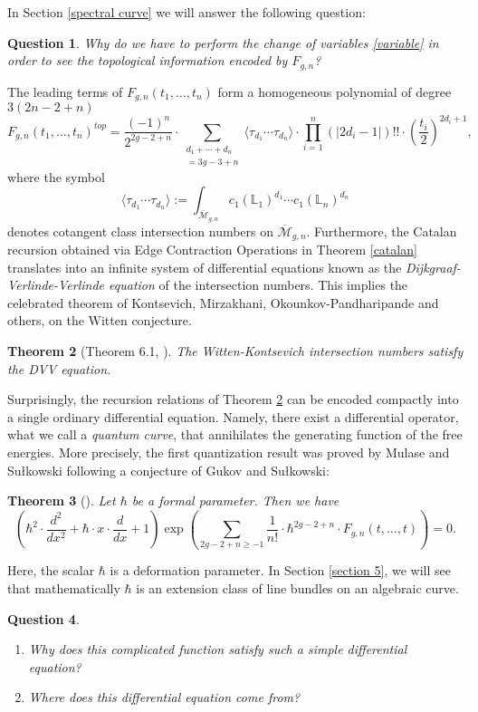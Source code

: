 \documentclass[oneside, 11pt]{amsart}
\newtheorem{thm}{Theorem}[section]
\newtheorem{quest}[thm]{Question}
\theoremstyle{definition}
\numberwithin{equation}{subsection}
\newcommand{\Mbar}{{\overline{\mathcal{M}}}}
\newcommand{\bL}{{\mathbb{L}}}
\newcommand{\la}{{\langle}}
\newcommand{\ra}{{\rangle}}
\begin{document}
In Section \ref{spectral curve} we will answer the following question:
\begin{quest}
Why do we have to perform the change of variables \eqref{variable} in order to see the topological information encoded by $F_{g,n}$?
\end{quest}
\noindent
The leading terms of $F_{g,n}(t_1,\ldots,t_n)$ form a homogeneous polynomial of degree \\ $3(2n-2+n)$ 
 $$F_{g,n}(t_1,\ldots, t_n)^{top}=\frac{(-1)^n}{2^{2g-2+n}} \cdot 
\sum_{\substack{d_1+\cdots+d_n\\
=3g-3+n}} \la \tau_{d_1}\cdots \tau_{d_n} \ra \cdot
\prod_{i=1}^n (|2d_i-1|)!! \cdot
\left(\frac{t_i}{2}\right)^{2d_i+1},$$
where the symbol
$${\la \tau_{d_1}\cdots \tau_{d_n} \ra}
:=\int_{\Mbar_{g,n}}c_1(\bL_1)^{d_1}
\cdots c_1(\bL_n)^{d_n}$$
denotes cotangent class intersection numbers on $\Mbar_{g,n}$. Furthermore, the Catalan recursion obtained via Edge Contraction Operations in Theorem \ref{catalan} translates into an infinite system of differential equations known as the \textit{Dijkgraaf-Verlinde-Verlinde equation} \cite{DVV}
of the intersection numbers. This implies the celebrated theorem of Kontsevich, Mirzakhani, Okounkov-Pandharipande and others, on the Witten conjecture.
\begin{thm}[Theorem 6.1, \cite{OD6}]\label{DVV}
The Witten-Kontsevich intersection numbers satisfy the DVV equation. 
\end{thm}
\noindent
Surprisingly, the recursion relations of Theorem \ref{DVV} can be encoded compactly into a 
single ordinary differential equation. Namely, there exist a differential operator, what we call a \textit{quantum curve}, that annihilates the generating function of the free energies. More precisely, the first quantization result was proved by Mulase and Su\l{}kowski following a conjecture of Gukov and Su\l{}kowski:

\begin{thm} [\cite{MS}]\label{thm MS} Let $\hbar$
be a formal parameter. Then we have
$$\left(\hbar^2 \cdot \frac{d^2}{dx^2}+\hbar \cdot x \cdot \frac{d}{dx}+1\right) 
\exp\left(\sum_{2g-2+n\ge -1}\frac{1}{n!}\cdot\hbar^{2g-2+n}\cdot F_{g,n}(t,\dots,t)
\right)=0.$$
\end{thm}


Here, the scalar $\hbar$ is a deformation parameter. In Section \ref{section 5}, we will see that mathematically $\hbar$ is an extension class of line bundles on an algebraic curve.

\begin{quest} 
\begin{enumerate}
\item Why does this complicated function satisfy such a simple differential equation? 
\item Where does this differential equation come from?
\end{enumerate}
\end{quest}
\end{document}
